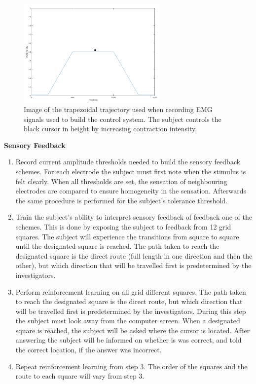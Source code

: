 \begin{figure}[H]                 
	\includegraphics[width=0.65\textwidth]{figures/trapezoid2}  
	\caption{Image of the trapezoidal trajectory used when recording EMG signals used to build the control system. The subject controls the black cursor in height by increasing contraction intensity.}
	\label{fig:trapezoid} 
\end{figure}

\textbf{Sensory Feedback} \\
\vspace{-25pt}
\begin{enumerate}
	\item Record current amplitude thresholds needed to build the sensory feedback schemes. For each electrode the subject must first note when the stimulus is felt clearly. When all thresholds are set, the sensation of neighbouring electrodes are compared to ensure homogeneity in the sensation. Afterwards the same procedure is performed for the subject's tolerance threshold. 
	\item Train the subject's ability to interpret sensory feedback of feedback one of the schemes. This is done by exposing the subject to feedback from 12 grid squares. The subject will experience the transitions from square to square until the designated square is reached. The path taken to reach the designated square is the direct route (full length in one direction and then the other), but which direction that will be travelled first is predetermined by the investigators.
	\item Perform reinforcement learning on all grid different squares. The path taken to reach the designated square is the direct route, but which direction that will be travelled first is predetermined by the investigators. During this step the subject must look away from the computer screen. When a designated square is reached, the subject will be asked where the cursor is located. After answering the subject will be informed on whether is was correct, and told the correct location, if the answer was incorrect. 
	\item Repeat reinforcement learning from step 3. The order of the squares and the route to each square will vary from step 3.
\end{enumerate}

